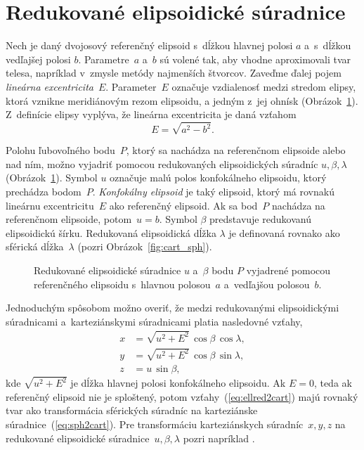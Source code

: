 \documentclass[a4paper, 12pt]{book}
\begin{document}
\section{Redukované elipsoidické súradnice}
\label{sec:reduced_ell_coords}

Nech je daný dvojosový referenčný elipsoid s~dĺžkou hlavnej polosi $a$ 
a~s~dĺžkou vedľajšej polosi $b$.  Parametre~$a$ a~$b$ sú volené tak, aby vhodne 
aproximovali tvar telesa, napríklad v~zmysle metódy najmenších štvorcov.  
Zaveďme ďalej pojem \emph{lineárna excentricita}~$E$.  Parameter~$E$ označuje 
vzdialenosť medzi stredom elipsy, ktorá vznikne meridiánovým rezom elipsoidu, 
a jedným z~jej ohnísk (Obrázok~\ref{fig:reduced_ell_coords}).  Z~definície 
elipsy vyplýva, že lineárna excentricita je daná vzťahom
%
\begin{equation}
\label{eq:linear_eccentricity}
E = \sqrt{a^2 - b^2}{.}
\end{equation}

Polohu ľubovoľného bodu~$P$, ktorý sa nachádza na referenčnom elipsoide alebo 
nad ním, možno vyjadriť pomocou redukovaných elipsoidických súradníc $u, \beta, 
\lambda$ (Obrázok~\ref{fig:reduced_ell_coords}).  Symbol $u$ označuje malú 
polos konfokálneho elipsoidu, ktorý prechádza bodom~$P$.  \emph{Konfokálny 
elipsoid} je taký elipsoid, ktorý má rovnakú lineárnu excentricitu~$E$ ako 
referenčný elipsoid.  Ak sa bod~$P$ nachádza na referenčnom elipsoide, potom~$u 
= b$.  Symbol $\beta$ predstavuje redukovanú elipsoidickú šírku.  Redukovaná 
elipsoidická dĺžka $\lambda$ je definovaná rovnako ako sférická dĺžka~$\lambda$ 
(pozri Obrázok~\ref{fig:cart_sph}).

\begin{figure}
\centering

\caption{Redukované elipsoidické súradnice $u$ a~$\beta$ bodu $P$ vyjadrené 
pomocou referenčného elipsoidu s~hlavnou polosou~$a$ a~vedľajšou polosou~$b$.}
\label{fig:reduced_ell_coords}
\end{figure}

Jednoduchým spôsobom možno overiť, že medzi redukovanými elipsoidickými 
súradnicami a~karteziánskymi súradnicami platia nasledovné vzťahy,
%
\begin{equation}
\label{eq:ellred2cart}
\begin{split}
x &= \sqrt{u^2 + E^2} \, \cos\beta \, \cos\lambda{,}\\
y &= \sqrt{u^2 + E^2} \, \cos\beta \, \sin\lambda{,}\\
z &= u \, \sin\beta{,}
\end{split}
\end{equation}
%
kde $\sqrt{u^2 + E^2}$ je dĺžka hlavnej polosi konfokálneho elipsoidu.  Ak $E 
= 0$, teda ak referenčný elipsoid nie je sploštený, potom 
vzťahy~(\ref{eq:ellred2cart}) majú rovnaký tvar ako transformácia sférických 
súradníc na karteziánske súradnice~(\ref{eq:sph2cart}).  Pre transformáciu 
karteziánskych súradníc~$x, y, z$ na redukované elipsoidické súradnice~$u, 
\beta, \lambda$ pozri napríklad \textcite{MoritzPhysicalGeodesy}.
\end{document}
